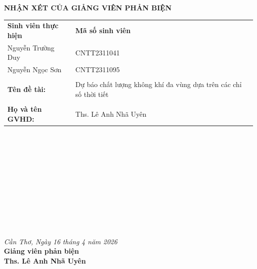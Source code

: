 \newpage
{}
{}

\begin{center}
    \textbf{\Large NHẬN XÉT CỦA GIẢNG VIÊN PHẢN BIỆN}
\end{center}

\vspace{1cm}

\begin{table}[h]
\begin{tabular}{ll}
\textbf{Sinh viên thực hiện} & \textbf{Mã số sinh viên} \\
Nguyễn Trường Duy            & CNTT2311041              \\
Nguyễn Ngọc Sơn              & CNTT2311095             \\

                           &                          \\
\textbf{Tên đề tài:}       & Dự báo chất lượng không khí đa vùng dựa trên các chỉ số thời tiết \\
                           &                          \\
\textbf{Họ và tên GVHD:}   & Ths. Lê Anh Nhã Uyên     \\
\end{tabular}
\end{table}

\vspace{0.5cm}
\noindent\makebox[\linewidth]{\dotfill} \\
\noindent\makebox[\linewidth]{\dotfill} \\
\noindent\makebox[\linewidth]{\dotfill} \\
\noindent\makebox[\linewidth]{\dotfill} \\
\noindent\makebox[\linewidth]{\dotfill} \\
\noindent\makebox[\linewidth]{\dotfill} \\
\noindent\makebox[\linewidth]{\dotfill} \\
\noindent\makebox[\linewidth]{\dotfill} \\
\noindent\makebox[\linewidth]{\dotfill} \\
\noindent\makebox[\linewidth]{\dotfill} \\
\noindent\makebox[\linewidth]{\dotfill}

\vspace{1cm}

\begin{flushright}
    \textit{Cần Thơ, Ngày 16 tháng 4 năm 2026} \\
    \textbf{Giảng viên phản biện} \\
    \vspace{2cm}
    \textbf{Ths. Lê Anh Nhã Uyên}
\end{flushright}